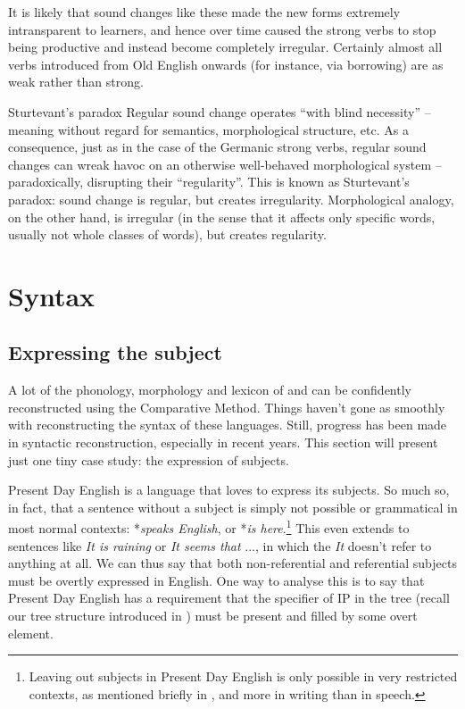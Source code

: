It is likely that sound changes like these made the new forms extremely intransparent to learners, and hence over time caused the strong verbs to stop being productive and instead become completely irregular. Certainly almost all verbs introduced from Old English onwards (for instance, via borrowing) are  as weak rather than strong.


\begin{varietybox}{Sturtevant's paradox}
Regular sound change operates ``with blind necessity'' -- meaning without regard for semantics, morphological structure, etc. As a consequence, just as in the case of the Germanic strong verbs, regular sound changes can wreak havoc on an otherwise well-behaved morphological system -- paradoxically, disrupting their ``regularity''. This is known as Sturtevant's paradox: sound change is regular, but creates irregularity. Morphological analogy, on the other hand, is irregular (in the sense that it affects only specific words, usually not whole classes of words), but creates regularity.
\end{varietybox}


\section{Syntax}
\subsection{Expressing the subject}\label{prehistory-subject}
A lot of the phonology, morphology and lexicon of  and  can be confidently reconstructed using the Comparative Method. Things haven't gone as smoothly with reconstructing the syntax of these languages. Still, progress has been made in syntactic reconstruction, especially in recent years. This section will present just one tiny case study: the expression of subjects.

Present Day English is a language that loves to express its subjects. So much so, in fact, that a sentence without a subject is simply not possible or grammatical in most normal contexts: *\emph{speaks English}, or *\emph{is here}.\footnote{Leaving out subjects in Present Day English is only possible in very restricted contexts, as mentioned briefly in , and more in writing than in speech.} This even extends to sentences like \emph{It is raining} or \emph{It seems that} ..., in which the \emph{It} doesn't refer to anything at all. We can thus say that both non-referential and referential subjects must be overtly expressed in English. One way to analyse this is to say that Present Day English has a requirement that the specifier of IP in the tree (recall our tree structure introduced in ) must be present and filled by some overt element.

